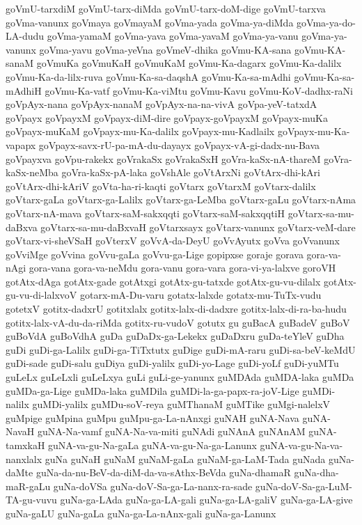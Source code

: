 {goVmU-tarxdiM
goVmU-tarx-diMda
goVmU-tarx-doM-dige
goVmU-tarxva
goVma-vanunx
goVmaya
goVmayaM
goVma-yada
goVma-ya-diMda
goVma-ya-do-LA-dudu
goVma-yamaM
goVma-yava
goVma-yavaM
goVma-ya-vanu
goVma-ya-vanunx
goVma-yavu
goVma-yeVna
goVmeV-dhika
goVmu-KA-sana
goVmu-KA-sanaM
goVmuKa
goVmuKaH
goVmuKaM
goVmu-Ka-dagarx
goVmu-Ka-dalilx
goVmu-Ka-da-lilx-ruva
goVmu-Ka-sa-daqshA
goVmu-Ka-sa-mAdhi
goVmu-Ka-sa-mAdhiH
goVmu-Ka-vatf
goVmu-Ka-viMtu
goVmu-Kavu
goVmu-KoV-dadhx-raNi
goVpAyx-nana
goVpAyx-nanaM
goVpAyx-na-na-vivA
goVpa-yeV-tatxdA
goVpayx
goVpayxM
goVpayx-diM-dire
goVpayx-goVpayxM
goVpayx-muKa
goVpayx-muKaM
goVpayx-mu-Ka-dalilx
goVpayx-mu-Kadlailx
goVpayx-mu-Ka-vapapx
goVpayx-savx-rU-pa-mA-du-dayayx
goVpayx-vA-gi-dadx-nu-Bava
goVpayxva
goVpu-rakekx
goVrakaSx
goVrakaSxH
goVra-kaSx-nA-thareM
goVra-kaSx-neMba
goVra-kaSx-pA-laka
goVshAle
goVtArxNi
goVtArx-dhi-kAri
goVtArx-dhi-kAriV
goVta-ha-ri-kaqti
goVtarx
goVtarxM
goVtarx-dalilx
goVtarx-gaLa
goVtarx-ga-Lalilx
goVtarx-ga-LeMba
goVtarx-gaLu
goVtarx-nAma
goVtarx-nA-mava
goVtarx-saM-sakxqqti
goVtarx-saM-sakxqqtiH
goVtarx-sa-mu-daBxva
goVtarx-sa-mu-daBxvaH
goVtarxsayx
goVtarx-vanunx
goVtarx-veM-dare
goVtarx-vi-sheVSaH
goVterxV
goVvA-da-DeyU
goVvAyutx
goVva
goVvanunx
goVviMge
goVvina
goVvu-gaLa
goVvu-ga-Lige
gopipxse
goraje
gorava
gora-va-nAgi
gora-vana
gora-va-neMdu
gora-vanu
gora-vara
gora-vi-ya-lalxve
goroVH
gotAtx-dAga
gotAtx-gade
gotAtxgi
gotAtx-gu-tatxde
gotAtx-gu-vu-dilalx
gotAtx-gu-vu-di-lalxvoV
gotarx-mA-Du-varu
gotatx-lalxde
gotatx-mu-TuTx-vudu
gotetxV
gotitx-dadxrU
gotitxlalx
gotitx-lalx-di-dadxre
gotitx-lalx-di-ra-ba-hudu
gotitx-lalx-vA-du-da-riMda
gotitx-ru-vudoV
gotutx
gu
guBacA
guBadeV
guBoV
guBoVdA
guBoVdhA
guDa
guDaDx-ga-Lekekx
guDaDxru
guDa-teYleV
guDha
guDi
guDi-ga-Lalilx
guDi-ga-TiTxtutx
guDige
guDi-mA-raru
guDi-sa-beV-keMdU
guDi-sade
guDi-salu
guDiya
guDi-yalilx
guDi-yo-Lage
guDi-yoLf
guDi-yuMTu
guLeLx
guLeLxli
guLeLxya
guLi
guLi-ge-yanunx
guMDAda
guMDA-laka
guMDa
guMDa-ga-Lige
guMDa-laka
guMDila
guMDi-la-ga-papx-ra-joV-Lige
guMDi-nalilx
guMDi-yalilx
guMDu-soV-reya
guMThanaM
guMTike
guMgi-nalelxV
guMpige
guMpina
guMpu
guMpu-ga-La-nAnxgi
guNAH
guNA-Nava
guNA-NavaH
guNA-Na-vamf
guNA-Na-va-miti
guNAdi
guNAnA
guNAnAM
guNA-tamxkaH
guNA-va-gu-Na-gaLa
guNA-va-gu-Na-ga-Lanunx
guNA-va-gu-Na-va-nanxlalx
guNa
guNaH
guNaM
guNaM-gaLa
guNaM-ga-LaM-Tada
guNada
guNa-daMte
guNa-da-nu-BeV-da-diM-da-va-sAthx-BeVda
guNa-dhamaR
guNa-dha-maR-gaLu
guNa-doVSa
guNa-doV-Sa-ga-La-nanx-ra-sade
guNa-doV-Sa-ga-LuM-TA-gu-vuvu
guNa-ga-LAda
guNa-ga-LA-gali
guNa-ga-LA-galiV
guNa-ga-LA-give
guNa-gaLU
guNa-gaLa
guNa-ga-La-nAnx-gali
guNa-ga-Lanunx
}
